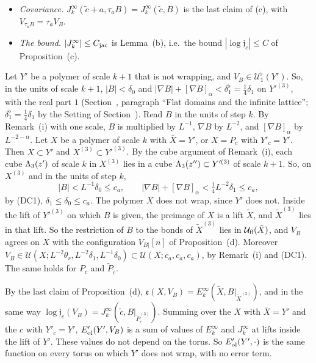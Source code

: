 \begin{detail}
\begin{step}[(d)]
\begin{itemize}
\item \emph{Covariance.} $J^\infty_k(\tilde c+a,\tau_aB)=J^\infty_k(\tilde c,B)$ is the last claim of (c), with $V_{\tau_aB}=\tau_aV_B$.
\item \emph{The bound.} $|J^\infty_k|\le C_{\rm jac}$ is Lemma~(b), i.e.\ the bound $|\log\mathfrak j_c|\le C$ of Proposition~(c).
\end{itemize}
\end{step}
\end{detail}

\begin{detail}\label{d9:ol-use}
\begin{step}
Let $Y'$ be a polymer of scale $k+1$ that is not wrapping, and $V_B\in\mathcal U^\flat_1(Y')$. So, in the units of scale $k+1$, $|B|<\delta_0$ and $|\nabla B|+[\nabla B]_\alpha<\delta_1^\flat=\frac14\delta_1$ on $Y'^{(3)}$, with the real part $1$ (Section~, paragraph ``Flat domains and the infinite lattice''; $\delta_1^\flat=\frac14\delta_1$ by the Setting of Section~). Read $B$ in the units of step $k$. By Remark~(i) with one scale, $B$ is multiplied by $L^{-1}$, $\nabla B$ by $L^{-2}$, and $[\nabla B]_\alpha$ by $L^{-2-\alpha}$. Let $X$ be a polymer of scale $k$ with $\bar X=Y'$, or $X=P_c$ with $Y'_c=Y'$. Then $X\subset Y'$ and $X^{(3)}\subset Y'^{(3)}$. By the cube argument of Remark~(i), each cube $\Lambda_3(z')$ of scale $k$ in $X^{(3)}$ lies in a cube $\Lambda_3(z'')\subset Y'^{(3)}$ of scale $k+1$. So, on $X^{(3)}$ and in the units of step $k$,
\[
|B|<L^{-1}\delta_0\le c_a,\qquad|\nabla B|+[\nabla B]_\alpha<\tfrac14L^{-2}\delta_1\le c_a,
\]
by (DC1), $\delta_1\le\delta_0\le c_a$. The polymer $X$ does not wrap, since $Y'$ does not. Inside the lift of $Y'^{(3)}$ on which $B$ is given, the preimage of $X$ is a lift $\tilde X$, and $\tilde X^{(3)}$ lies in that lift. So the restriction of $B$ to the bonds of $\tilde X^{(3)}$ lies in $\mathcal U_{\rm fl}(\tilde X)$, and $V_B$ agrees on $X$ with the configuration $V_{B|}[n]$ of Proposition~(d). Moreover $V_B\in\mathcal U(X;L^{-2}\theta_r,L^{-2}\delta_1,L^{-1}\delta_0)\subset\mathcal U(X;c_a,c_a,c_a)$, by Remark~(i) and (DC1). The same holds for $P_c$ and $\tilde P_{\tilde c}$.
\end{step}
\begin{step}
By the last claim of Proposition~(d), $\mathfrak e(X,V_B)=E^\infty_k(\tilde X,B|_{\tilde X^{(3)}})$, and in the same way $\log\mathfrak j_c(V_B)=J^\infty_k(\tilde c,B|_{\tilde P^{(3)}_{\tilde c}})$. Summing over the $X$ with $\bar X=Y'$ and the $c$ with $Y'_c=Y'$, $E'_{\rm ol}(Y',V_B)$ is a sum of values of $E^\infty_k$ and $J^\infty_k$ at lifts inside the lift of $Y'$. These values do not depend on the torus. So $E'_{\rm ol}(Y',\cdot)$ is the same function on every torus on which $Y'$ does not wrap, with no error term.


\end{step}
\end{detail}
